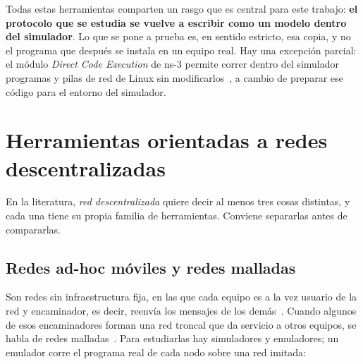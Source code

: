 Todas estas herramientas comparten un rasgo que es central para este trabajo:
\textbf{el protocolo que se estudia se vuelve a escribir como un modelo dentro del
simulador}. Lo que se pone a prueba es, en sentido estricto, esa copia, y no el
programa que después se instala en un equipo real. Hay una excepción parcial: el
módulo \textit{Direct Code Execution} de ns-3 permite correr dentro del simulador
programas y pilas de red de Linux sin modificarlos~\cite{Tazaki2013DCE}, a cambio
de preparar ese código para el entorno del simulador.

\section{Herramientas orientadas a redes descentralizadas}
\label{sec:simuladores-descentralizados}

En la literatura, \textit{red descentralizada} quiere decir al menos tres cosas
distintas, y cada una tiene su propia familia de herramientas. Conviene separarlas
antes de compararlas.

\subsection{Redes ad-hoc móviles y redes malladas}
\label{subsec:manet}

Son redes sin infraestructura fija, en las que cada equipo es a la vez usuario de
la red y encaminador, es decir, reenvía los mensajes de los
demás~\cite{Corson1999RFC2501}. Cuando algunos de esos encaminadores forman una
red troncal que da servicio a otros equipos, se habla de redes
malladas~\cite{Akyildiz2005Mesh}. Para estudiarlas hay simuladores y
emuladores; un emulador corre el programa real de cada nodo sobre una red
imitada:

